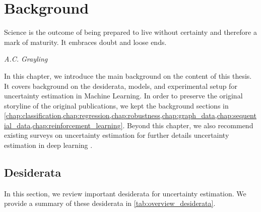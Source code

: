 \chapter{Background}
\label{chap:background}

\epigraph{Science is the outcome of being prepared to live without certainty and therefore a mark of maturity. It embraces doubt and loose ends.}{\textit{A.C. Grayling}}

In this chapter, we introduce the main background on the content of this thesis. It covers background on the desiderata, models, and experimental setup for uncertainty estimation in Machine Learning. In order to preserve the original storyline of the original publications, we kept the background sections in \cref{chap:classification,chap:regression,chap:robustness,chap:graph_data,chap:sequential_data,chap:reinforcement_learning}. Beyond this chapter, we also recommend existing surveys on uncertainty estimation for further details uncertainty estimation in deep learning \citep{uncertainty-survey,review-uncertainty-dl,psaros2023uncertainty,conformal-survey,hullermeier2021aleatoric}.

\section{Desiderata}

In this section, we review important desiderata for uncertainty estimation. We provide a summary of these desiderata in \cref{tab:overview_desiderata}.

\begin{table}[ht]
    \begin{center}
    \end{center}
    \caption{Overview of desiderata for models for uncertainty estimation. Important desiderata involve modelling Bayesian distributions, distinguishing between uncertainty types, and fulfilling practical requirements.}
    \label{tab:overview_desiderata}
\end{table}

